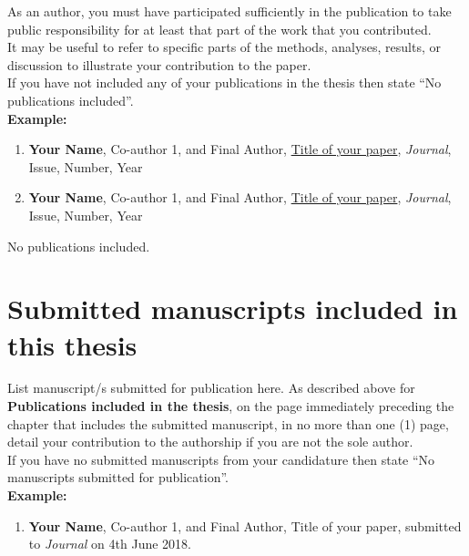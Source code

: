 \begin{instructional}
	\noindent
	As an author, you must have participated sufficiently in the publication to take public responsibility for at least that part of the work that you contributed.\\
    
    \noindent
	It may be useful to refer to specific parts of the methods, analyses, results, or discussion to illustrate your contribution to the paper.\\
    
    \noindent
	If you have not included any of your publications in the thesis then state ``No publications included''.\\
	
	\textbf{Example:}
	\begin{enumerate}

    \item \cite{DumyCitationKey} \textbf{Your Name}, Co-author 1, and Final Author, \href{linktoyourpaper}{Title of your paper}, \textit{Journal}, Issue, Number, Year

    \item \cite{DumyCitationKey} \textbf{Your Name}, Co-author 1, and Final Author, \href{linktoyourpaper}{Title of your paper}, \textit{Journal}, Issue, Number, Year

    \end{enumerate}
	
\end{instructional}


No publications included.



\section*{Submitted manuscripts included in this thesis}

\begin{instructional}
	List manuscript/s submitted for publication here. As described above for \textbf{Publications included in the thesis}, on the page immediately preceding the chapter that includes the submitted manuscript, in no more than one (1) page, detail your contribution to the authorship if you are not the sole author.\\
    
    \noindent
    If you have no submitted manuscripts from your candidature then state ``No manuscripts submitted for publication''.\\
    
    \textbf{Example:}
    \begin{enumerate}

    \item \cite{DumyCitationKey} \textbf{Your Name}, Co-author 1, and Final Author, Title of your paper, submitted to \textit{Journal} on 4th June 2018.

    \end{enumerate}
\end{instructional}

